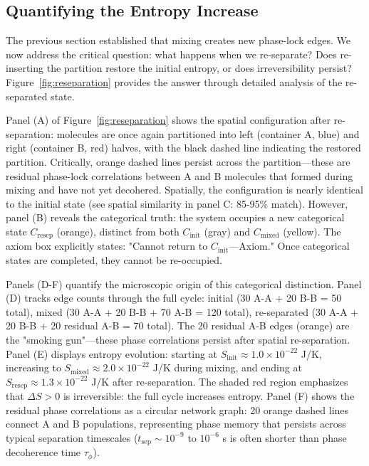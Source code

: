 \documentclass[twocolumn,superscriptaddress,prb,10pt]{revtex4-2}
\theoremstyle{definition}
\theoremstyle{remark}
\begin{document}
\subsection{Quantifying the Entropy Increase}

The previous section established that mixing creates new phase-lock edges. We now address the critical question: what happens when we re-separate? Does re-inserting the partition restore the initial entropy, or does irreversibility persist? Figure~\ref{fig:reseparation} provides the answer through detailed analysis of the re-separated state.

Panel (A) of Figure~\ref{fig:reseparation} shows the spatial configuration after re-separation: molecules are once again partitioned into left (container A, blue) and right (container B, red) halves, with the black dashed line indicating the restored partition. Critically, orange dashed lines persist across the partition—these are residual phase-lock correlations between A and B molecules that formed during mixing and have not yet decohered. Spatially, the configuration is nearly identical to the initial state (see spatial similarity in panel C: 85-95\% match). However, panel (B) reveals the categorical truth: the system occupies a new categorical state $C_{\text{resep}}$ (orange), distinct from both $C_{\text{init}}$ (gray) and $C_{\text{mixed}}$ (yellow). The axiom box explicitly states: "Cannot return to $C_{\text{init}}$—Axiom." Once categorical states are completed, they cannot be re-occupied.

Panels (D-F) quantify the microscopic origin of this categorical distinction. Panel (D) tracks edge counts through the full cycle: initial (30 A-A + 20 B-B = 50 total), mixed (30 A-A + 20 B-B + 70 A-B = 120 total), re-separated (30 A-A + 20 B-B + 20 residual A-B = 70 total). The 20 residual A-B edges (orange) are the "smoking gun"—these phase correlations persist after spatial re-separation. Panel (E) displays entropy evolution: starting at $S_{\text{init}} \approx 1.0 \times 10^{-22}$ J/K, increasing to $S_{\text{mixed}} \approx 2.0 \times 10^{-22}$ J/K during mixing, and ending at $S_{\text{resep}} \approx 1.3 \times 10^{-22}$ J/K after re-separation. The shaded red region emphasizes that $\Delta S > 0$ is irreversible: the full cycle increases entropy. Panel (F) shows the residual phase correlations as a circular network graph: 20 orange dashed lines connect A and B populations, representing phase memory that persists across typical separation timescales ($t_{\text{sep}} \sim 10^{-9}$ to $10^{-6}$ s is often shorter than phase decoherence time $\tau_{\phi}$).
\end{document}
